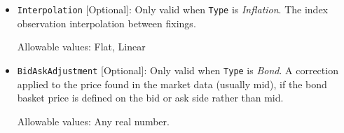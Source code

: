 \begin{itemize}
\item \lstinline!Interpolation! [Optional]:
Only valid when \lstinline!Type! is  \emph{Inflation}. The index observation interpolation between fixings.

Allowable values: Flat, Linear

\item \lstinline!BidAskAdjustment! [Optional]: Only valid when \lstinline!Type! is \emph{Bond}. A correction applied to
  the price found in the market data (usually mid), if the bond basket price is defined on the bid or ask side rather
  than mid.

Allowable values: Any real number.

\end{itemize}
